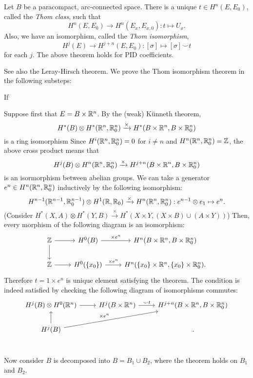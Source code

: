 \documentclass{../../../small}
\begin{document}
\begin{thm*}
Let $B$ be a paracompact, arc-connected space.
There is a unique $t\in H^n(E,E_0)$, called the \emph{Thom class}, such that
\[H^n(E,E_0)\to H^n(E_x,E_{x,0}):t\mapsto U_x.\]
Also, we have an isomorphism, called the \emph{Thom isomorphism},
\[H^j(E)\to H^{j+n}(E,E_0):[\sigma]\mapsto[\sigma]\smile t\]
for each $j$.
The above theorem holds for PID coefficients.
\end{thm*}

See also the Leray-Hirsch theorem.
We prove the Thom isomorphism theorem in the following substeps:
\begin{parts}
\item If 
\end{parts}

\begin{pf}
Suppose first that $E=B\times\mathbb{R}^n$.
By the (weak) K\"unneth theorem,
\[H^*(B)\otimes H^*(\mathbb{R}^n,\mathbb{R}^n_0)\xrightarrow{\times}H^*(B\times\mathbb{R}^n,B\times\mathbb{R}^n_0)\]
is a ring isomorphism
Since $H^i(\mathbb{R}^n,\mathbb{R}^n_0)=0$ for $i\ne n$ and $H^n(\mathbb{R}^n,\mathbb{R}^n_0)=\mathbb{Z}$, the above cross product means that
\[H^j(B)\otimes H^n(\mathbb{R}^n,\mathbb{R}^n_0)\xrightarrow{\times}H^{j+n}(B\times\mathbb{R}^n,B\times\mathbb{R}^n_0)\]
is an isormorphism between abelian groups.
We can take a generator $e^n\in H^n(\mathbb{R}^n,\mathbb{R}^n_0)$ inductively by the following isomorphism:
\[H^{n-1}(\mathbb{R}^{n-1},\mathbb{R}^{n-1}_0)\otimes H^1(\mathbb{R},\mathbb{R}_0)\xrightarrow{\times}H^n(\mathbb{R}^n,\mathbb{R}^n_0):e^{n-1}\otimes e_1\mapsto e^n.\]
(Consider $H^*(X,A)\otimes H^*(Y,B)\xrightarrow{\times}H^*(X\times Y,(X\times B)\cup(A\times Y))$)
Then, every morphism of the following diagram is an isomorphism:
\[\begin{tikzcd}
\Z \ar{r}\ar{d} & H^0(B) \ar{r}{\times e^n}& H^n(B\times\R^n,B\times\R_0^n)\\
\Z \ar{r} & H^0(\{x_0\}) \ar{r}{\times e^n}& H^n(\{x_0\}\times\R^n,\{x_0\}\times\R_0^n).\end{tikzcd}\]
Therefore $t=1\times e^n$ is unique element satisfying the theorem.
The condition is indeed satisfied by checking the following diagram of isomorphisms commutes:
\[\begin{tikzcd}
H^j(B)\otimes H^0(\R^n)\ar{r} & H^j(B\times\R^n) \ar{r}{\smile t} & H^{j+n}(B\times\R^n,B\times\R_0^n)\\
H^j(B)\ar{u}\ar{urr}{\times e^n}&\,&\,.\\
\end{tikzcd}\]

Now consider $B$ is decomposed into $B=B_1\cup B_2$, where the theorem holds on $B_1$ and $B_2$.





\end{pf}
\end{document}
